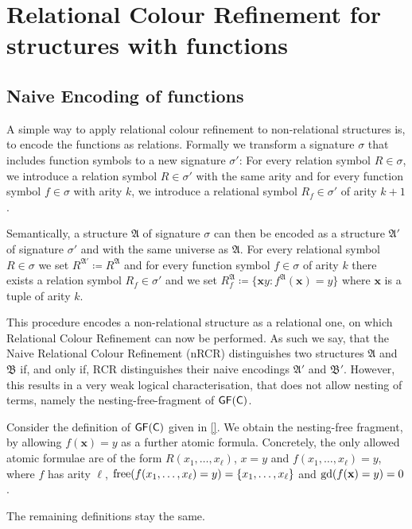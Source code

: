\section{Relational Colour Refinement for structures with functions}
\label{sec:RelationalColourRefinemetForStructuresWithFunctions}

\subsection{Naive Encoding of functions}
\label{Sec::NaiveEncodingOfFunctions}

A simple way to apply relational colour refinement to non-relational structures is, to encode the functions as relations.
Formally we transform a signature $\sigma$ that includes function symbols to a new signature $\sigma'$: 
For every relation symbol $R\in \sigma$, we introduce a relation symbol $R\in \sigma'$ with the same arity and for every function symbol $f\in\sigma$ with arity $k$, we introduce a relational symbol $R_f\in\sigma'$ of arity $k+1$.

Semantically, a structure $\mathfrak A$ of signature $\sigma$ can then be encoded as a structure $\mathfrak A'$ of signature $\sigma'$ and with the same universe as $\mathfrak A$. 
For every relational symbol $R\in\sigma$ we set $R^{\mathfrak A'}\coloneqq R^{\mathfrak A}$ and for every function symbol $f\in\sigma$ of arity $k$ there exists a relation symbol $R_f\in\sigma'$ and we set $R_f^{\mathfrak A}\coloneqq \{\mathbf xy : f^{\mathfrak A}(\mathbf x)=y\}$ where $\mathbf x$ is a tuple of arity $k$.

This procedure encodes a non-relational structure as a relational one, on which Relational Colour Refinement can now be performed.
As such we say, that the Naive Relational Colour Refinement (nRCR) distinguishes two structures $\mathfrak A$ and $\mathfrak B$ if, and only if, RCR distinguishes their naive encodings $\mathfrak A'$ and $\mathfrak B'$.
However, this results in a very weak logical characterisation, that does not allow nesting of terms, namely the nesting-free-fragment of $\mathsf{GF}(\mathsf{C})$.

\begin{definition}
	Consider the definition of $\mathsf{GF}(\mathsf{C})$ given in \ref{}.
	We obtain the nesting-free fragment, by allowing $f(\mathbf x)=y$ as a further atomic formula.
	Concretely, the only allowed atomic formulae are of the form $R(x_1,\dots,x_\ell)$, $x=y$ and $f(x_1,\dots,x_\ell)=y$, where $f$ has arity $\ell$, $\operatorname{free}(f(x_1,\dots,x_\ell)=y)=\{x_1,\dots,x_\ell\}$ and $\operatorname{gd}(f(\mathbf x)=y)=0$.
	
	The remaining definitions stay the same.
\end{definition}

